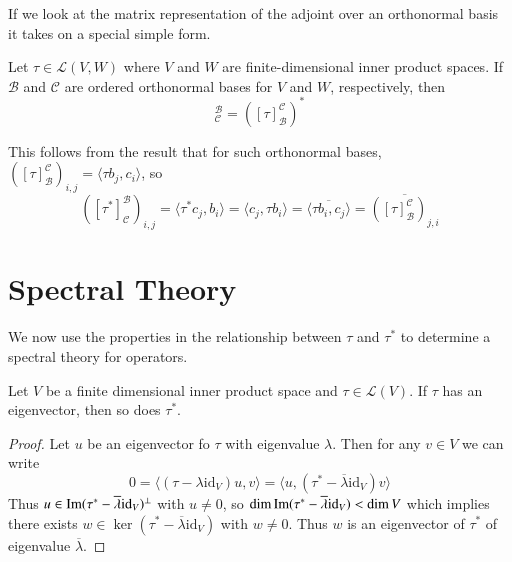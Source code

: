If we look at the matrix representation of the adjoint over an orthonormal basis it takes on a special simple form.

\begin{theorem}
    Let $\tau \in \mathcal{L}(V,W)$ where $V$ and $W$ are finite-dimensional inner product spaces. If $\mathcal{B}$ and $\mathcal{C}$ are ordered orthonormal bases for $V$ and $W$, respectively, then \begin{equation*}
        [\tau^*]_{\mathcal{C}}^{\mathcal{B}} = ([\tau]_{\mathcal{B}}^{\mathcal{C}})^*
    \end{equation*}
\end{theorem}
This follows from the result that for such orthonormal bases, $([\tau]_{\mathcal{B}}^{\mathcal{C}})_{i,j} = \langle \tau b_j,c_i\rangle$, so \begin{equation*}
    ([\tau^*]_{\mathcal{C}}^{\mathcal{B}})_{i,j} = \langle \tau^*c_j,b_i\rangle = \langle c_j,\tau b_i\rangle = \overline{\langle \tau b_i,c_j\rangle} = \overline{([\tau]_{\mathcal{B}}^{\mathcal{C}})_{j,i}}
\end{equation*}


\section{Spectral Theory}\label{sec:specTheory}


We now use the properties in the relationship between $\tau$ and $\tau^*$ to determine a spectral theory for operators.

\begin{lemma}
    Let $V$ be a finite dimensional inner product space and $\tau \in \mathcal{L}(V)$. If $\tau$ has an eigenvector, then so does $\tau^*$.
\end{lemma}
\begin{proof}
    Let $u$ be an eigenvector fo $\tau$ with eigenvalue $\lambda$. Then for any $v \in V$ we can write \begin{equation*}
        0 = \langle (\tau-\lambda \text{id}_V)u,v\rangle = \langle u,(\tau^*-\overline{\lambda}\text{id}_V)v\rangle
    \end{equation*}
    Thus $u \in \operatorname{Im}(\tau^*-\overline{\lambda}\text{id}_V)^{\perp}$ with $u \neq 0$, so $\dim\operatorname{Im}(\tau^*-\overline{\lambda}\text{id}_V) < \dim V$ which implies there exists $w \in \ker(\tau^*-\overline{\lambda}\text{id}_V)$ with $w \neq 0$. Thus $w$ is an eigenvector of $\tau^*$ of eigenvalue $\overline{\lambda}$.
\end{proof}

